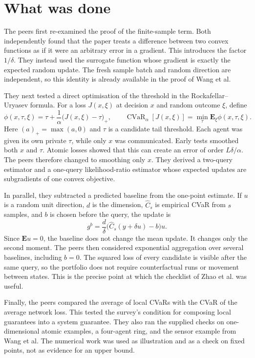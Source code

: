 \documentclass{article}
\newcommand{\E}{\mathbf{E}}
\newcommand{\CVaR}{\operatorname{CVaR}}
\begin{document}
\section{What was done}

The peers first re-examined the proof of the finite-sample term. Both independently found that the paper treats a difference between two convex functions as if it were an arbitrary error in a gradient. This introduces the factor $1/\delta$. They instead used the surrogate function whose gradient is exactly the expected random update. The fresh sample batch and random direction are independent, so this identity is already available in the proof of Wang et al.

They next tested a direct optimisation of the threshold in the Rockafellar--Uryasev formula. For a loss $J(x,\xi)$ at decision $x$ and random outcome $\xi$, define
\begin{equation}
 \phi(x,\tau,\xi)=\tau+\frac{1}{\alpha}\bigl(J(x,\xi)-\tau\bigr)_+,
 \qquad
 \CVaR_\alpha[J(x,\xi)]=\min_\tau \E_\xi\phi(x,\tau,\xi).
 \label{eq:ru}
\end{equation}
Here $(a)_+=\max(a,0)$ and $\tau$ is a candidate tail threshold. Each agent was given its own private $\tau$, while only $x$ was communicated. Early tests smoothed both $x$ and $\tau$. Atomic losses showed that this can create an error of order $L\delta/\alpha$. The peers therefore changed to smoothing only $x$. They derived a two-query estimator and a one-query likelihood-ratio estimator whose expected updates are subgradients of one convex objective.

In parallel, they subtracted a predicted baseline from the one-point estimate. If $u$ is a random unit direction, $d$ is the dimension, $\widehat C_s$ is empirical CVaR from $s$ samples, and $b$ is chosen before the query, the update is
\begin{equation}
 g^b=\frac d\delta\bigl(\widehat C_s(y+\delta u)-b\bigr)u.
 \label{eq:baseline}
\end{equation}
Since $\E u=0$, the baseline does not change the mean update. It changes only the second moment. The peers then considered exponential aggregation over several baselines, including $b=0$. The squared loss of every candidate is visible after the same query, so the portfolio does not require counterfactual runs or movement between states. This is the precise point at which the checklist of Zhao et al. was useful.

Finally, the peers compared the average of local CVaRs with the CVaR of the average network loss. This tested the survey's condition for composing local guarantees into a system guarantee. They also ran the supplied checks on one-dimensional atomic examples, a four-agent ring, and the sensor example from Wang et al. The numerical work was used as illustration and as a check on fixed points, not as evidence for an upper bound.
\end{document}
